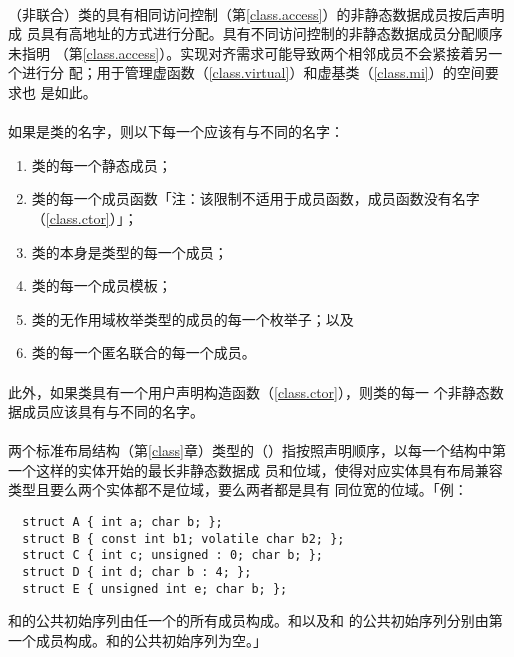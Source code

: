 \paragraph{}
（非联合）类的具有相同访问控制（第\ref{class.access}）的非静态数据成员按后声明成
员具有高地址的方式进行分配。具有不同访问控制的非静态数据成员分配顺序未指明
（第\ref{class.access}）。实现对齐需求可能导致两个相邻成员不会紧接着另一个进行分
配；用于管理虚函数（\ref{class.virtual}）和虚基类（\ref{class.mi}）的空间要求也
是如此。

\paragraph{}
如果是类的名字，则以下每一个应该有与不同的名字：
\begin{enumerate}
  \item{类的每一个静态成员；}
  \item{类的每一个成员函数「注：该限制不适用于成员函数，成员函数没有名字
    （\ref{class.ctor}）」；}
  \item{类的本身是类型的每一个成员；}
  \item{类的每一个成员模板；}
  \item{类的无作用域枚举类型的成员的每一个枚举子；以及}
  \item{类的每一个匿名联合的每一个成员。}
\end{enumerate}

\paragraph{}
此外，如果类具有一个用户声明构造函数（\ref{class.ctor}），则类的每一
个非静态数据成员应该具有与不同的名字。

\paragraph{}
两个标准布局结构（第\ref{class}章）类型的（）指按照声明顺序，以每一个结构中第一个这样的实体开始的最长非静态数据成
员和位域，使得对应实体具有布局兼容类型且要么两个实体都不是位域，要么两者都是具有
同位宽的位域。「例：
\begin{lstlisting}
  struct A { int a; char b; };
  struct B { const int b1; volatile char b2; };
  struct C { int c; unsigned : 0; char b; };
  struct D { int d; char b : 4; };
  struct E { unsigned int e; char b; };
\end{lstlisting}
和的公共初始序列由任一个的所有成员构成。和以及和
的公共初始序列分别由第一个成员构成。和的公共初始序列为空。」

